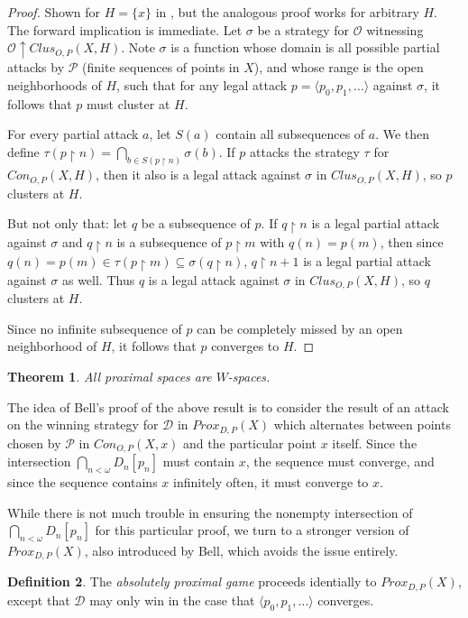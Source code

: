 \documentclass{amsart}
\newtheorem{thm}{Theorem}[section]
\theoremstyle{definition}
\newtheorem{defn}[thm]{Definition}
\theoremstyle{remark}
\newcommand{\<}{\langle}
\renewcommand{\>}{\rangle}
\newcommand{\proxgame}[1]{Prox_{D,P}(#1)}
\newcommand{\congame}[2]{Con_{O,P}(#1,#2)}
\newcommand{\clusgame}[2]{Clus_{O,P}(#1,#2)}
\newcommand{\pl}[1]{\mathscr{#1}}
\newcommand{\win}{\uparrow}
\newcommand{\rest}{\restriction}
\newcommand{\term}{\textit}
\begin{document}
\begin{proof}
  Shown for $H=\{x\}$ in \cite{ginfinite}, but the analogous proof works for arbitrary $H$. The forward implication is immediate. Let $\sigma$ be a strategy for $\pl O$ witnessing $\pl O\win \clusgame{X}{H}$. Note $\sigma$ is a function whose domain is all possible partial attacks by $\pl P$ (finite sequences of points in $X$), and whose range is the open neighborhoods of $H$, such that for any legal attack $p=\<p_0,p_1,\dots\>$ against $\sigma$, it follows that $p$ must cluster at $H$.

  For every partial attack $a$, let $S(a)$ contain all subsequences of $a$. We then define $\tau(p\rest n)=\bigcap_{b\in S(p\rest n)}\sigma(b)$. If $p$ attacks the strategy $\tau$ for $\congame{X}{H}$, then it also is a legal attack against $\sigma$ in $\clusgame{X}{H}$, so $p$ clusters at $H$.

  But not only that: let $q$ be a subsequence of $p$. If $q\rest n$ is a legal partial attack against $\sigma$ and $q\rest n$ is a subsequence of $p\rest m$ with $q(n)=p(m)$, then since $q(n)=p(m)\in\tau(p\rest m)\subseteq\sigma(q\rest n)$, $q\rest n+1$ is a legal partial attack against $\sigma$ as well. Thus $q$ is a legal attack against $\sigma$ in $\clusgame{X}{H}$, so $q$ clusters at $H$.

  Since no infinite subsequence of $p$ can be completely missed by an open neighborhood of $H$, it follows that $p$ converges to $H$.
\end{proof}

\begin{thm}\cite{b}
  All proximal spaces are $W$-spaces.
\end{thm}


The idea of Bell's proof of the above result is to consider the result of an attack on the winning strategy for $\pl D$ in $\proxgame{X}$ which alternates between points chosen by $\pl P$ in $\congame{X}{x}$ and the particular point $x$ itself. Since the intersection $\bigcap_{n<\omega} D_n[p_n]$ must contain $x$, the sequence must converge, and since the sequence contains $x$ infinitely often, it must converge to $x$.


While there is not much trouble in ensuring the nonempty intersection of\\ $\bigcap_{n<\omega} D_n[p_n]$ for this particular proof, we turn to a stronger version of $\proxgame{X}$, also introduced by Bell, which avoids the issue entirely.

\begin{defn}
  The \term{absolutely proximal game}  proceeds identially to $\proxgame{X}$, except that $\pl D$ may only win in the case that $\<p_0,p_1,\dots\>$ converges.
\end{defn}
\end{document}
